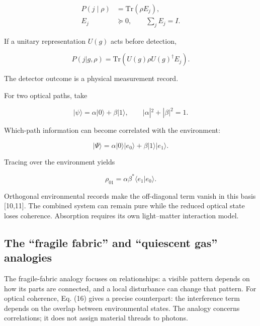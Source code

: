 \documentclass[11pt,a4paper]{article}
\begin{document}
\begin{equation}\label{eq:12}
\begin{aligned}
P(j\mid\rho)&=\mathrm{Tr}(\rho E_j),\\
E_j&\succeq0,\qquad \sum_j E_j=I.
\end{aligned}
\end{equation}

If a unitary representation \(U(g)\) acts before detection,

\begin{equation}\label{eq:13}
P(j|g,\rho)=\mathrm{Tr}\!\left(U(g)\rho U(g)^\dagger E_j\right).
\end{equation}

The detector outcome is a physical measurement record.

For two optical paths, take

\begin{equation}\label{eq:14}
|\psi\rangle=\alpha|0\rangle+\beta|1\rangle,\qquad
|\alpha|^2+|\beta|^2=1.
\end{equation}

Which-path information can become correlated with the environment:

\begin{equation}\label{eq:15}
|\Psi\rangle
=\alpha|0\rangle|e_0\rangle
+\beta|1\rangle|e_1\rangle.
\end{equation}

Tracing over the environment yields

\begin{equation}\label{eq:16}
\rho_{01}=\alpha\beta^*\langle e_1|e_0\rangle.
\end{equation}

Orthogonal environmental records make the off-diagonal term vanish in this basis {[}10,11{]}. The combined system can remain pure while the reduced optical state loses coherence. Absorption requires its own light--matter interaction model.

\hypertarget{the-fragile-fabric-and-quiescent-gas-analogies}{%
\subsection{The ``fragile fabric'' and ``quiescent gas'' analogies}\label{the-fragile-fabric-and-quiescent-gas-analogies}}

The fragile-fabric analogy focuses on relationships: a visible pattern depends on how its parts are connected, and a local disturbance can change that pattern. For optical coherence, Eq. (16) gives a precise counterpart: the interference term depends on the overlap between environmental states. The analogy concerns correlations; it does not assign material threads to photons.
\end{document}
